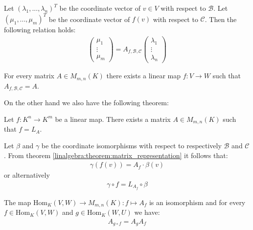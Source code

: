         \begin{theorem}\label{linalgebra:theorem:matrix_representation}
		Let $(\lambda_1, ..., \lambda_n)^T$ be the coordinate vector of $v\in V$ with respect to $\mathcal{B}$. Let $(\mu_1, ..., \mu_m)^T$ be the coordinate vector of $f(v)$ with respect to $\mathcal{C}$. Then the following relation holds:
            	\begin{gather}
			\left(
			\begin{array}{c}
				\mu_1\\
				\vdots\\
				\mu_m
			\end{array}\right)
	                = A_{f, \mathcal{B}, \mathcal{C}}
        	        \left(\begin{array}{c}
				\lambda_1\\
				\vdots\\
				\lambda_n
			\end{array}\right)
		\end{gather}
	\end{theorem}
        
        \begin{theorem}\label{linalgebra:theorem:map_matrix_link}
		For every matrix $A\in M_{m,n}(K)$ there exists a linear map $f:V\rightarrow W$ such that $A_{f, \mathcal{B}, \mathcal{C}} = A$.
	\end{theorem}
        On the other hand we also have the following theorem:
        \begin{theorem}
		Let $f:K^n\rightarrow K^m$ be a linear map. There exists a matrix $A\in M_{m,n}(K)$ such that $f=L_A$.
	\end{theorem}
        \begin{theorem}
		Let $\beta$ and $\gamma$ be the coordinate isomorphisms with respect to respectively $\mathcal{B}$ and $\mathcal{C}$. From theorem \ref{linalgebra:theorem:matrix_representation} it follows that:
        	\begin{gather}
			\gamma(f(v)) = A_f\cdot\beta(v)
		\end{gather}
        	or alternatively
        	\begin{gather}
			\gamma\circ f = L_{A_f}\circ\beta
		\end{gather}
	\end{theorem}
        
        \begin{theorem}\label{linalgebra:theorem:matrix_composition_hom}
	        The map $\text{Hom}_K(V,W)\rightarrow M_{m,n}(K):f\mapsto A_f$ is an isomorphism and for every $f\in\text{Hom}_K(V,W)$ and $g\in \text{Hom}_K(W,U)$ we have:
		\begin{gather}
			A_{g\circ f} = A_gA_f
		\end{gather}
	\end{theorem}
	
